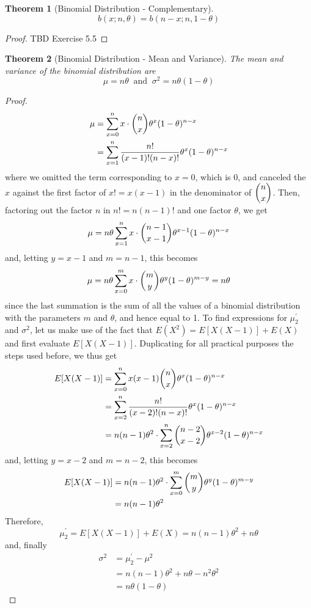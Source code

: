 \documentclass[
10pt,reqno
]{amsart}
\newtheorem{theorem}{Theorem}[section]
\theoremstyle{definition}
\begin{document}
\begin{theorem}[Binomial Distribution - Complementary]
\[
b(x; n, \theta)=b(n-x; n, 1 - \theta)
\]
\end{theorem}

\begin{proof}
TBD Exercise 5.5
\end{proof}

\newpage

\begin{theorem}[Binomial Distribution - Mean and Variance]
The mean and variance of the binomial distribution are
\[
\mu = n\theta \;\; \text{and} \;\; \sigma^2 = n \theta(1-\theta)
\]
\end{theorem}

\begin{proof}
\begin{align*}
\mu &= \sum_{x=0}^n x \cdot \dbinom n x \theta^x (1-\theta)^{n-x}\\
&= \sum_{x=1}^n \frac{n!}{(x-1)!(n-x)!}\theta^x(1-\theta)^{n-x}
\end{align*}
where we omitted the term corresponding to \(x=0\), which is 0, and canceled the \(x\) against the first factor of \(x!=x(x-1)\) in the denominator of \(\dbinom n x\). Then, factoring out the factor \(n\) in \(n! = n(n-1)!\) and one factor \(\theta\), we get
\[
\mu = n \theta \sum_{x=1}^n x \cdot \dbinom {n-1} {x-1} \theta^{x-1} (1-\theta)^{n-x}\\
\]
and, letting \(y=x-1\) and \(m = n-1\), this becomes
\[
\mu = n \theta \sum_{x=0}^m x \cdot \dbinom {m} {y} \theta^{y}(1-\theta)^{m-y}=n \theta
\]
since the last summation is the sum of all the values of a binomial distribution with the parameters \(m\) and \(\theta\), and hence equal to 1.
To find expressions for \(\mu_2^{'}\) and \(\sigma^2\), let us make use of the fact that \(E(X^2) = E[X(X-1)]+E(X)\) and first evaluate \(E[X(X-1)]\). Duplicating for all practical purposes the steps used before, we thus get
\begin{align*}
E[X(X-1)] &= \sum_{x=0}^n x (x-1) \dbinom n x \theta^x (1-\theta)^{n-x}\\
&= \sum_{x=2}^n \frac {n!} {(x-2)!(n-x)!} \theta^{x} (1-\theta)^{n-x}\\
&=n(n-1)\theta^2 \cdot \sum_{x=2}^n \dbinom {n-2}{x-2}\theta^{x-2} (1-\theta)^{n-x}
\end{align*}
and, letting \(y=x-2\) and \(m=n-2\), this becomes
\begin{align*}
E[X(X-1)] &= n(n-1)\theta^2 \cdot \sum_{x=0}^m \dbinom m y \theta^y (1-\theta)^{m-y}\\
&= n(n-1)\theta^2
\end{align*}
Therefore,
\[
\mu_2^{'} = E[X(X-1)] + E(X) = n(n-1) \theta^2 + n \theta
\]
and, finally
\begin{align*}
\sigma^2 &= \mu_2^{'} - \mu^2\\
&=n(n-1)\theta^2 + n\theta - n^2\theta^2 \\
&=n\theta(1-\theta)
\end{align*}
\end{proof}
\end{document}
